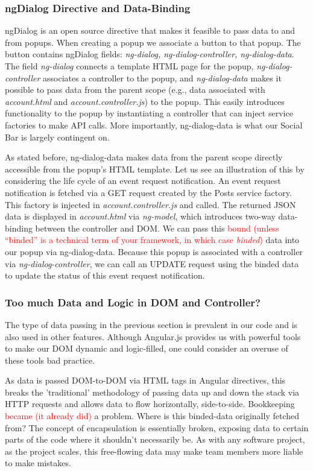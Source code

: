 \documentclass[a4paper]{article}
\newcommand{\comment}[1]{\textcolor{red}{#1}}
\begin{document}
\subsubsection{ngDialog Directive and Data-Binding}
ngDialog is an open source directive that makes it feasible to pass data to and from popups. When creating a popup we associate a button to that popup. The button contains ngDialog fields: \textit{ng-dialog, ng-dialog-controller, ng-dialog-data}. The field \textit{ng-dialog} connects a template HTML page for the popup, \textit{ng-dialog-controller} associates a controller to the popup, and \textit{ng-dialog-data} makes it possible to pass data from the parent scope (e.g., data associated with \textit{account.html} and \textit{account.controller.js}) to the popup. This easily introduces functionality to the popup by instantiating a controller that can inject service factories to make API calls. More importantly, ng-dialog-data is what our Social Bar is largely contingent on.

As stated before, ng-dialog-data makes data from the parent scope directly accessible from the popup's HTML template. Let us see an illustration of this by considering the life cycle of an event request notification. An event request notification is fetched via a GET request created by the Posts service factory. This factory is injected in \textit{account.controller.js} and called. The returned JSON data is displayed in \textit{account.html} via \textit{ng-model}, which introduces two-way data-binding between the controller and DOM. We can pass this \comment{bound (unless ``binded'' is a technical term of your framework, in which case \emph{binded})} data into our popup via ng-dialog-data. Because this popup is associated with a controller via \textit{ng-dialog-controller}, we can call an UPDATE request using the binded data to update the status of this event request notification.

\subsubsection{Too much Data and Logic in DOM and Controller?}

The type of data passing in the previous section is prevalent in our code and is also used in other features. Although Angular.js provides us with powerful tools to make our DOM dynamic and logic-filled, one could consider an overuse of these tools bad practice.

As data is passed DOM-to-DOM via HTML tags in Angular directives, this breaks the 'traditional' methodology of passing data up and down the stack via HTTP requests and allows data to flow horizontally, side-to-side. Bookkeeping \comment{became (it already did)} a problem. Where is this binded-data originally fetched from? The concept of encapsulation is essentially broken, exposing data to certain parts of the code where it shouldn't necessarily be. As with any software project, as the project scales, this free-flowing data may make team members more liable to make mistakes.
\end{document}
